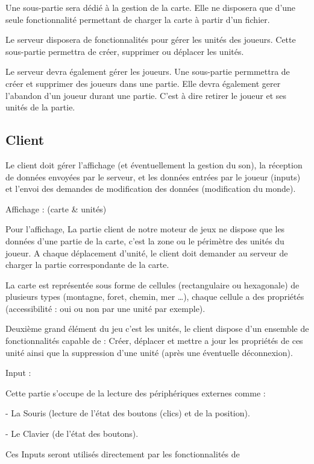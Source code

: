 \documentclass[a4paper,10pt]{report}
\begin{document}
Une sous-partie sera dédié à la gestion de la carte. Elle ne disposera que d'une seule fonctionnalité permettant de charger la carte à partir d'un fichier.

Le serveur disposera de fonctionnalités pour gérer les unités des joueurs. Cette sous-partie permettra de créer, supprimer ou déplacer les unités.

Le serveur devra également gérer les joueurs. Une sous-partie permmettra de créer et supprimer des joueurs dans une partie. Elle devra également gerer l'abandon d'un joueur durant une partie. C'est à dire retirer le joueur et ses unités de la partie.



\subsection{Client}

Le client doit gérer l'affichage (et éventuellement la gestion du son), la réception de données envoyées par le serveur, et les données entrées par le joueur (inputs) et l'envoi des demandes de modification des données (modification du monde).

Affichage : (carte & unités)

Pour l’affichage, La partie client de notre moteur de jeux ne dispose que les données d’une partie de la carte, c’est la zone ou le périmètre des unités du joueur. A chaque déplacement d’unité, le client doit demander au serveur de charger la partie  correspondante de la carte.

La carte est représentée sous forme de cellules (rectangulaire ou hexagonale) de plusieurs types (montagne, foret, chemin, mer …), chaque cellule a des propriétés (accessibilité : oui ou non par une unité par exemple).

Deuxième grand élément du jeu c’est les unités, le client dispose d’un ensemble de fonctionnalités capable de : Créer, déplacer et mettre a jour les propriétés de ces unité ainsi que la suppression d’une unité (après une éventuelle déconnexion).

Input :

Cette partie s'occupe de la lecture des périphériques externes comme :

- La Souris (lecture de l'état des boutons (clics) et de la position).

- Le Clavier (de l'état des boutons).

Ces Inputs seront utilisés directement par les fonctionnalités de
\end{document}
